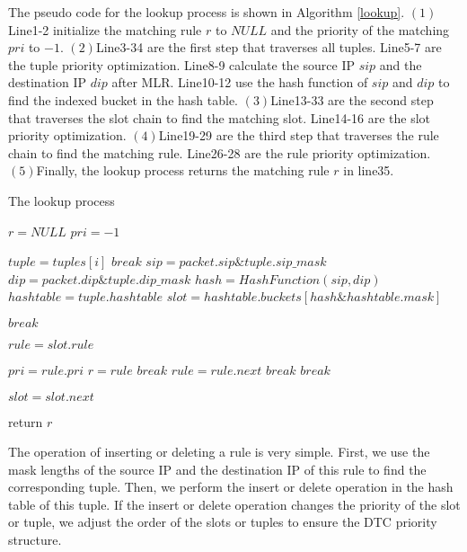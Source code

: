 The pseudo code for the lookup process is shown in Algorithm \ref{lookup}. $(1)$Line1-2 initialize the matching rule $r$ to $NULL$ and the priority of the matching $pri$ to $-1$. $(2)$Line3-34 are the first step that traverses all tuples. Line5-7 are the tuple priority optimization. Line8-9 calculate the source IP $sip$ and the destination IP $dip$ after MLR. Line10-12 use the hash function of $sip$ and $dip$ to find the indexed bucket in the hash table. $(3)$Line13-33 are the second step that traverses the slot chain to find the matching slot. Line14-16 are the slot priority optimization. $(4)$Line19-29 are the third step that traverses the rule chain to find the matching rule. Line26-28 are the rule priority optimization. $(5)$Finally, the lookup process returns the matching rule $r$ in line35.






\begin{algorithm}
    \caption{The lookup process}
    \label{lookup}

    $r = NULL$\;
    $pri = -1$\;
     {
        $tuple = tuples[i]$\;
         {
            $break$\;
        }
        $sip = packet.sip \& tuple.sip\_mask$\;
        $dip = packet.dip \& tuple.dip\_mask$\;
        $hash = HashFunction(sip, dip)$\;
        $hashtable = tuple.hashtable$\;
        $slot = hashtable.buckets[hash\&hashtable.mask]$\;
         {
             {
                $break$\;
            }
             {
                $rule = slot.rule$\;
                
                 {
                 {
                        $pri = rule.pri$\;
                        $r = rule$\;
                        $break$\;
                    }
                    $rule = rule.next$\;
                     {
                        $break$\;
                    }
                }
                $break$\;
            }
            $slot = slot.next$\;
        }
    }
    return $r$\;
\end{algorithm}

The operation of inserting or deleting a rule is very simple. First, we use the mask lengths of the source IP and the destination IP of this rule to find the corresponding tuple. Then, we perform the insert or delete operation in the hash table of this tuple. If the insert or delete operation changes the priority of the slot or tuple, we adjust the order of the slots or tuples to ensure the DTC priority structure. 